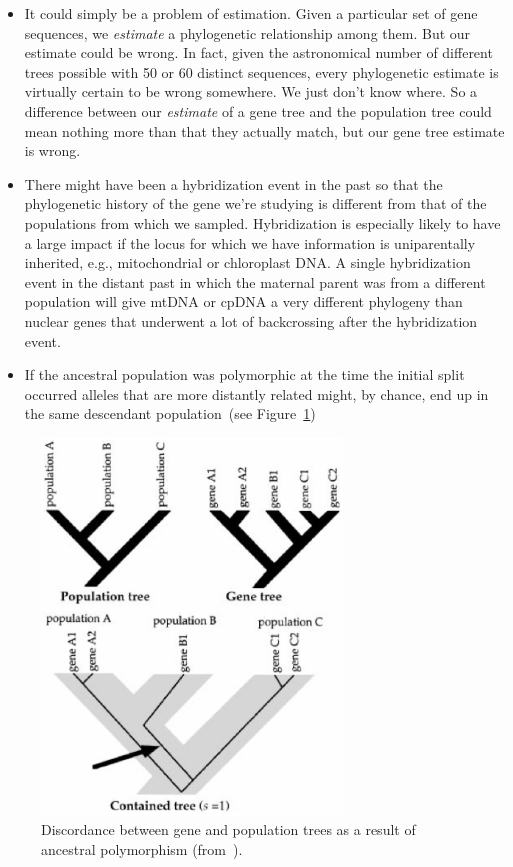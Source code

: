 \documentclass[12pt]{article}
\begin{document}
\begin{itemize}

\item It could simply be a problem of estimation. Given a particular
  set of gene sequences, we {\it estimate} a phylogenetic relationship
  among them. But our estimate could be wrong. In fact, given the
  astronomical number of different trees possible with 50 or 60
  distinct sequences, every phylogenetic estimate is virtually certain
  to be wrong somewhere. We just don't know where. So a difference
  between our {\it estimate\/} of a gene tree and the population tree
  could mean nothing more than that they actually match, but our gene
  tree estimate is wrong.

\item There might have been a hybridization event in the past so that
  the phylogenetic history of the gene we're studying is different
  from that of the populations from which we sampled. Hybridization is
  especially likely to have a large impact if the locus for which we
  have information is uniparentally inherited, e.g., mitochondrial or
  chloroplast DNA. A single hybridization event in the distant past in
  which the maternal parent was from a different population will give
  mtDNA or cpDNA a very different phylogeny than nuclear genes that
  underwent a lot of backcrossing after the hybridization event.

\item If the ancestral population was polymorphic at the time the
  initial split occurred alleles that are more distantly related
  might, by chance, end up in the same descendant population~(see
  Figure~\ref{fig:ancestral-polymorphism})

\end{itemize}

\begin{figure}
\begin{center}
\includegraphics[height=10cm]{ancestral-polymorphism.eps}
\end{center}
\caption{Discordance between gene and population trees as a result of
  ancestral polymorphism
  (from~\cite{Knowles-2001}).}\label{fig:ancestral-polymorphism} 
\end{figure}
\end{document}
